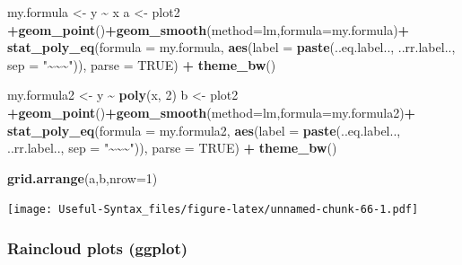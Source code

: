 \documentclass[
]{article}
\newenvironment{Shaded}{\begin{snugshade}}{\end{snugshade}}
\newcommand{\AttributeTok}[1]{\textcolor[rgb]{0.13,0.29,0.53}{#1}}
\newcommand{\ConstantTok}[1]{\textcolor[rgb]{0.56,0.35,0.01}{#1}}
\newcommand{\DecValTok}[1]{\textcolor[rgb]{0.00,0.00,0.81}{#1}}
\newcommand{\FunctionTok}[1]{\textcolor[rgb]{0.13,0.29,0.53}{\textbf{#1}}}
\newcommand{\NormalTok}[1]{#1}
\newcommand{\OtherTok}[1]{\textcolor[rgb]{0.56,0.35,0.01}{#1}}
\newcommand{\SpecialCharTok}[1]{\textcolor[rgb]{0.81,0.36,0.00}{\textbf{#1}}}
\newcommand{\StringTok}[1]{\textcolor[rgb]{0.31,0.60,0.02}{#1}}
\begin{document}
\begin{Shaded}
\begin{Highlighting}[]
\NormalTok{my.formula }\OtherTok{\textless{}{-}}\NormalTok{ y }\SpecialCharTok{\textasciitilde{}}\NormalTok{ x}
\NormalTok{a }\OtherTok{\textless{}{-}}\NormalTok{ plot2 }\SpecialCharTok{+}\FunctionTok{geom\_point}\NormalTok{()}\SpecialCharTok{+}\FunctionTok{geom\_smooth}\NormalTok{(}\AttributeTok{method=}\StringTok{\textquotesingle{}lm\textquotesingle{}}\NormalTok{,}\AttributeTok{formula=}\NormalTok{my.formula)}\SpecialCharTok{+}
  \FunctionTok{stat\_poly\_eq}\NormalTok{(}\AttributeTok{formula =}\NormalTok{ my.formula, }\FunctionTok{aes}\NormalTok{(}\AttributeTok{label =} \FunctionTok{paste}\NormalTok{(..eq.label.., ..rr.label..,}
                                                       \AttributeTok{sep =} \StringTok{"\textasciitilde{}\textasciitilde{}\textasciitilde{}"}\NormalTok{)), }\AttributeTok{parse =} \ConstantTok{TRUE}\NormalTok{) }\SpecialCharTok{+}
  \FunctionTok{theme\_bw}\NormalTok{()}

\NormalTok{my.formula2 }\OtherTok{\textless{}{-}}\NormalTok{ y }\SpecialCharTok{\textasciitilde{}} \FunctionTok{poly}\NormalTok{(x, }\DecValTok{2}\NormalTok{)}
\NormalTok{b }\OtherTok{\textless{}{-}}\NormalTok{ plot2 }\SpecialCharTok{+}\FunctionTok{geom\_point}\NormalTok{()}\SpecialCharTok{+}\FunctionTok{geom\_smooth}\NormalTok{(}\AttributeTok{method=}\StringTok{\textquotesingle{}lm\textquotesingle{}}\NormalTok{,}\AttributeTok{formula=}\NormalTok{my.formula2)}\SpecialCharTok{+}
  \FunctionTok{stat\_poly\_eq}\NormalTok{(}\AttributeTok{formula =}\NormalTok{ my.formula2, }\FunctionTok{aes}\NormalTok{(}\AttributeTok{label =} \FunctionTok{paste}\NormalTok{(..eq.label.., ..rr.label..,}
                                                        \AttributeTok{sep =} \StringTok{"\textasciitilde{}\textasciitilde{}\textasciitilde{}"}\NormalTok{)), }\AttributeTok{parse =} \ConstantTok{TRUE}\NormalTok{) }\SpecialCharTok{+}
  \FunctionTok{theme\_bw}\NormalTok{()}

\FunctionTok{grid.arrange}\NormalTok{(a,b,}\AttributeTok{nrow=}\DecValTok{1}\NormalTok{)}
\end{Highlighting}
\end{Shaded}

\texttt{[image: Useful-Syntax\_files/figure-latex/unnamed-chunk-66-1.pdf]}

\hypertarget{raincloud-plots-ggplot}{%
\subsubsection{Raincloud plots (ggplot)}\label{raincloud-plots-ggplot}}
\end{document}

